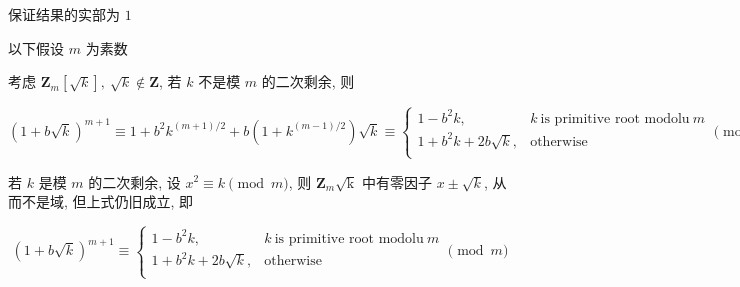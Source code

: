 保证结果的实部为 \(1\)

以下假设 \(m\) 为素数

考虑 \(\mathbf{Z}_m\left[\sqrt{k}\right],~\sqrt{k}\notin \mathbf{Z}\), 若 \(k\) 不是模 \(m\) 的二次剩余, 则

\[
    \left(1+b\sqrt{k}\right)^{m+1}\equiv 1+b^2 k^{(m+1)/2} + b\left(1+k^{(m-1)/2}\right)\sqrt{k} \equiv\begin{cases}
        1-b^2 k,              & k ~\text{is primitive root modolu}~ m \\
        1+b^2 k + 2b\sqrt{k}, & \text{otherwise}                      \\
    \end{cases} \pmod m
\]

若 \(k\) 是模 \(m\) 的二次剩余, 设 \(x^2\equiv k\pmod m\), 则 \(\mathbf{Z}_m\mathrm{\sqrt{k}}\) 中有零因子 \(x\pm\sqrt{k}\), 从而不是域, 但上式仍旧成立, 即

\[
    \left(1+b\sqrt{k}\right)^{m+1}\equiv\begin{cases}
        1-b^2 k,              & k ~\text{is primitive root modolu}~ m \\
        1+b^2 k + 2b\sqrt{k}, & \text{otherwise}                      \\
    \end{cases} \pmod m
\]

